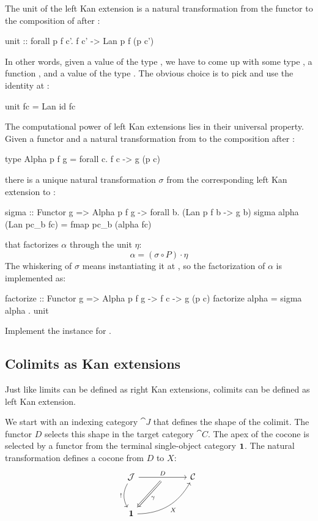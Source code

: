 \documentclass[DaoFP]{subfiles}
\begin{document}
 The unit of the left Kan extension is a natural transformation from the functor  to the composition of  after :
 \begin{haskell}
unit :: forall p f c'. 
    f c' -> Lan p f (p c')
\end{haskell}
In other words, given a value of the type , we have to come up with some type , a function , and a value of the type . The obvious choice is to pick  and use the identity at :
\begin{haskell}
unit fc = Lan id fc
\end{haskell}

The computational power of left Kan extensions lies in their universal property. Given a functor  and a natural transformation from  to the composition  after :
\begin{haskell}
type Alpha p f g = forall c. f c -> g (p c)
\end{haskell}
there is a unique natural transformation $\sigma$ from the corresponding left Kan extension to :
\begin{haskell}
sigma :: Functor g => Alpha p f g -> forall b. (Lan p f b -> g b)
sigma alpha (Lan pc_b fc) = fmap pc_b (alpha fc)
\end{haskell}
that factorizes $\alpha$ through the unit $\eta$:
\[ \alpha = (\sigma \circ P) \cdot \eta \]
The whiskering of $\sigma$ means instantiating it at , so the factorization of $\alpha$ is implemented as:
\begin{haskell}
factorize :: Functor g => Alpha p f g -> f c -> g (p c)
factorize alpha = sigma alpha . unit
\end{haskell}
 \begin{exercise}
Implement the  instance for .
\end{exercise}

\subsection{Colimits as Kan extensions}

Just like limits can be defined as right Kan extensions, colimits can be defined as left Kan extension. 

We start with an indexing category $\cat J$ that defines the shape of the colimit. The functor $D$ selects this shape in the target category $\cat C$. The apex of the cocone is selected by a functor from the terminal single-object category $\mathbf{1}$. The natural transformation defines a cocone from $D$ to $X$:
\[
 \begin{tikzcd} [row sep=1cm, column sep=1cm]
 \cat J
 \arrow[rr, "D", "" {name=ID, below} ]
 \arrow[d, bend right, "!"']
 && \cat C
 \\
 \Cat 1
  \arrow[urr, bend right, "X"']
 \arrow[Rightarrow, "\gamma",  from=ID]
 \end{tikzcd}
\]
\end{document}
